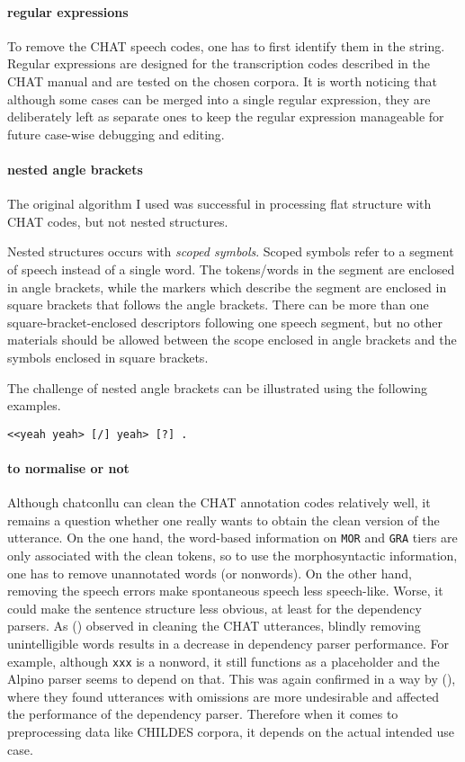 \paragraph{regular expressions} To remove the CHAT speech codes, one has to first identify them in the string. Regular expressions are designed for the transcription codes described in the CHAT manual and are tested on the chosen corpora. It is worth noticing that although some cases can be merged into a single regular expression, they are deliberately left as separate ones to keep the regular expression manageable for future case-wise debugging and editing.

\paragraph{nested angle brackets} The original algorithm I used was successful in processing flat structure with CHAT codes, but not nested structures.

Nested structures occurs with \emph{scoped symbols}. Scoped symbols refer to a segment of speech instead of a single word. The tokens/words in the segment are enclosed in angle brackets, while the markers which describe the segment are enclosed in square brackets that follows the angle brackets. There can be more than one square-bracket-enclosed descriptors following one speech segment, but no other materials should be allowed between the scope enclosed in angle brackets and the symbols enclosed in square brackets.

The challenge of nested angle brackets can be illustrated using the following examples.

\texttt{<<yeah yeah> [/] yeah> [?] .}

\paragraph{to normalise or not} Although chatconllu can clean the CHAT annotation codes relatively well, it remains a question whether one really wants to obtain the clean version of the utterance. On the one hand, the word-based information on \texttt{MOR} and \texttt{GRA} tiers are only associated with the clean tokens, so to use the morphosyntactic information, one has to remove unannotated words (or nonwords). On the other hand, removing the speech errors make spontaneous speech less speech-like. Worse, it could make the sentence structure less obvious, at least for the dependency parsers. As (\cite{odijk2018anncor}) observed in cleaning the CHAT utterances, blindly removing unintelligible words results in a decrease in dependency parser performance. For example, although \texttt{xxx} is a nonword, it still functions as a placeholder  and the Alpino parser seems to depend on that. This was again confirmed in a way by (\cite{liu2021}), where they found utterances with omissions are more undesirable and affected the performance of the dependency parser. Therefore when it comes to preprocessing data like CHILDES corpora, it depends on the actual intended use case.

